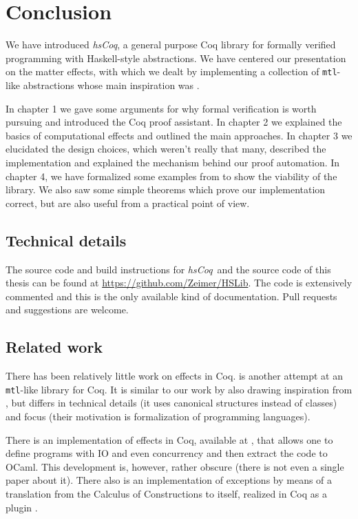 \documentclass[declaration,inz,english,shortabstract]{iithesis}
\newcommand{\libname}{\textit{hsCoq}}
\newcommand{\homepage}{\url{https://github.com/Zeimer/HSLib}}
\newcommand{\m}[1]{\texttt{#1}}
\begin{document}
\chapter{Conclusion}

We have introduced \libname, a general purpose Coq library for formally verified programming with Haskell-style abstractions. We have centered our presentation on the matter effects, with which we dealt by implementing a collection of \m{mtl}-like abstractions whose main inspiration was \cite{JustDoIt}.

In chapter 1 we gave some arguments for why formal verification is worth pursuing and introduced the Coq proof assistant. In chapter 2 we explained the basics of computational effects and outlined the main approaches. In chapter 3 we elucidated the design choices, which weren't really that many, described the implementation and explained the mechanism behind our proof automation. In chapter 4, we have formalized some examples from \cite{JustDoIt} to show the viability of the library. We also saw some simple theorems which prove our implementation correct, but are also useful from a practical point of view.

\section{Technical details}

The source code and build instructions for \libname\ and the source code of this thesis can be found at \homepage. The code is extensively commented and this is the only available kind of documentation. Pull requests and suggestions are welcome.

\section{Related work}

There has been relatively little work on effects in Coq. \cite{MERC} is another attempt at an \m{mtl}-like library for Coq. It is similar to our work by also drawing inspiration from \cite{JustDoIt}, but differs in technical details (it uses canonical structures instead of classes) and focus (their motivation is formalization of programming languages).

There is an implementation of effects in Coq, available at \cite{CoqIO}, that allows one to define programs with IO and even concurrency and then extract the code to OCaml. This development is, however, rather obscure (there is not even a single paper about it). There also is an implementation of exceptions by means of a translation from the Calculus of Constructions to itself, realized in Coq as a plugin \cite{FailureIsNotAnOption}.
\end{document}
